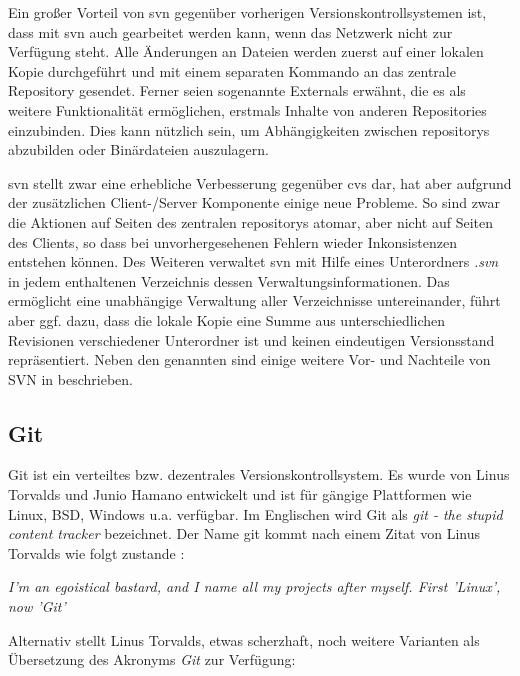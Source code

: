 Ein großer Vorteil von \acrshort{svn} gegenüber vorherigen
Versionskontrollsystemen ist, dass mit \acrshort{svn} auch gearbeitet werden
kann, wenn das Netzwerk nicht zur Verfügung steht. Alle Änderungen an Dateien
werden zuerst auf einer lokalen Kopie durchgeführt und mit einem separaten
Kommando an das zentrale Repository gesendet. Ferner seien sogenannte Externals
erwähnt, die es als weitere Funktionalität ermöglichen, erstmals Inhalte von
anderen Repositories einzubinden. Dies kann nützlich sein, um Abhängigkeiten
zwischen \glspl{repository} abzubilden oder Binärdateien auszulagern. \cite[S.~384]{cd}

\acrshort{svn} stellt zwar eine erhebliche Verbesserung gegenüber
\acrshort{cvs} dar, hat aber aufgrund der zusätzlichen Client-/Server
Komponente einige neue Probleme. So sind zwar die Aktionen auf Seiten des
zentralen \glspl{repository} atomar, aber nicht auf Seiten des Clients, so dass
bei unvorhergesehenen Fehlern wieder Inkonsistenzen entstehen können. Des
Weiteren verwaltet \acrshort{svn} mit Hilfe eines Unterordners \textit{.svn} in
jedem enthaltenen Verzeichnis dessen Verwaltungsinformationen. Das ermöglicht
eine unabhängige Verwaltung aller Verzeichnisse untereinander, führt aber ggf.
dazu, dass die lokale Kopie eine Summe aus unterschiedlichen Revisionen
verschiedener Unterordner ist und keinen eindeutigen Versionsstand
repräsentiert. Neben den genannten sind einige weitere Vor- und Nachteile von
SVN in \cite[S.~382-385]{cd} beschrieben.

\subsection{Git}\label{git}
Git ist ein verteiltes bzw. dezentrales Versionskontrollsystem. Es wurde von Linus
Torvalds und Junio Hamano entwickelt und ist für gängige Plattformen wie Linux,
BSD, Windows u.a. verfügbar. Im Englischen wird Git als \textit{git - the
stupid content tracker} bezeichnet. Der Name \acrshort{git} kommt nach einem
Zitat von Linus Torvalds wie folgt zustande \cite{link:gitfaq}:

\begin{center}
\textit{\glqq{}I'm an egoistical bastard, and I name all my projects after
myself. First 'Linux', now 'Git'\grqq{}}\\
\end{center}

Alternativ stellt Linus Torvalds, etwas scherzhaft, noch weitere Varianten als
Übersetzung des Akronyms \textit{Git} zur Verf\-ügung\cite{link:gitfaq}:

